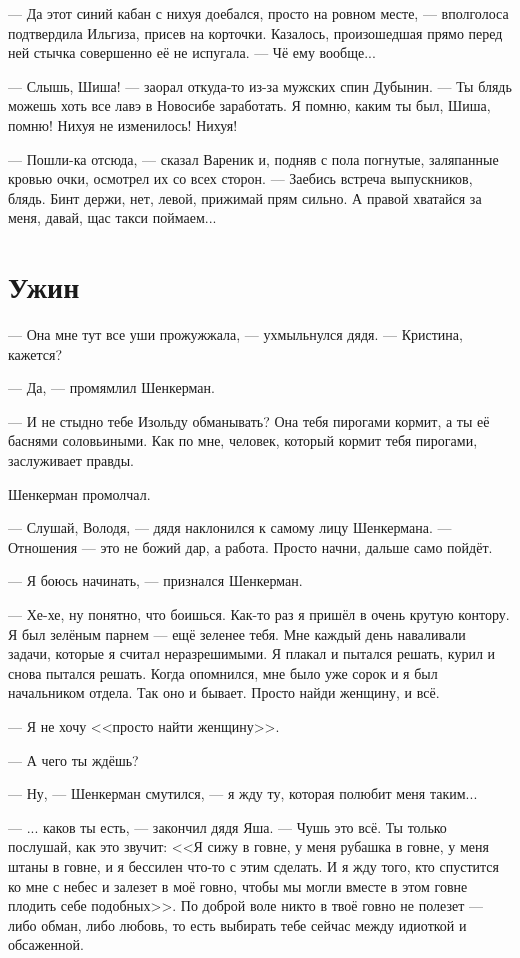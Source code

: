 \documentclass[a4paper,10pt,fleqn]{book}\usepackage{polyglossia}\setdefaultlanguage{english}\setotherlanguage{russian}\defaultfontfeatures{Ligatures=TeX,Mapping=tex-text} \usepackage{xcolor}\definecolor{lightgray}{HTML}{bbbbbb}\color{lightgray}\newcommand{\ml}[3]{\textcolor{black}{#3}}
\begin{document}
--- Да этот синий кабан с нихуя доебался, просто на ровном месте, --- вполголоса подтвердила Ильгиза, присев на корточки.
Казалось, произошедшая прямо перед ней стычка совершенно её не испугала.
--- Чё ему вообще...

--- Слышь, Шиша! --- заорал откуда-то из-за мужских спин Дубынин.
--- Ты блядь можешь хоть все лавэ в Новосибе заработать.
Я помню, каким ты был, Шиша, помню!
Нихуя не изменилось!
Нихуя!

--- Пошли-ка отсюда, --- сказал Вареник и, подняв с пола погнутые, заляпанные кровью очки, осмотрел их со всех сторон.
--- Заебись встреча выпускников, блядь.
Бинт держи, нет, левой, прижимай прям сильно.
А правой хватайся за меня, давай, щас такси поймаем...

\section{Ужин}


--- Она мне тут все уши прожужжала, --- ухмыльнулся дядя.
--- Кристина, кажется?

--- Да, --- промямлил Шенкерман.

--- И не стыдно тебе Изольду обманывать?
Она тебя пирогами кормит, а ты её баснями соловьиными.
Как по мне, человек, который кормит тебя пирогами, заслуживает правды.

Шенкерман промолчал.

--- Слушай, Володя, --- дядя наклонился к самому лицу Шенкермана.
--- Отношения --- это не божий дар, а работа.
Просто начни, дальше само пойдёт.

--- Я боюсь начинать, --- признался Шенкерман.

--- Хе-хе, ну понятно, что боишься.
Как-то раз я пришёл в очень крутую контору.
Я был зелёным парнем --- ещё зеленее тебя.
Мне каждый день наваливали задачи, которые я считал неразрешимыми.
Я плакал и пытался решать, курил и снова пытался решать.
Когда опомнился, мне было уже сорок и я был начальником отдела.
Так оно и бывает.
Просто найди женщину, и всё.

--- Я не хочу <<просто найти женщину>>.

--- А чего ты ждёшь?

--- Ну, --- Шенкерман смутился, --- я жду ту, которая полюбит меня таким...

---  ... каков ты есть, --- закончил дядя Яша.
--- Чушь это всё.
Ты только послушай, как это звучит: <<Я сижу в говне, у меня рубашка в говне, у меня штаны в говне, и я бессилен что-то с этим сделать.
И я жду того, кто спустится ко мне с небес и залезет в моё говно, чтобы мы могли вместе в этом говне плодить себе подобных>>.
По доброй воле никто в твоё говно не полезет --- либо обман, либо любовь, то есть выбирать тебе сейчас между идиоткой и обсаженной.
\end{document}
